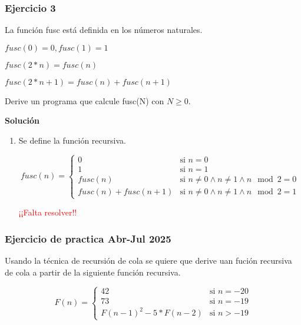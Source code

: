 \documentclass[hidelinks]{article}
\begin{document}
\subsubsection{Ejercicio 3}

La función fusc está definida en los números naturales.\par

$fusc(0) = 0, fusc(1) = 1$\par
$fusc(2*n) = fusc(n)$\par
$fusc(2*n + 1) = fusc(n) + fusc(n + 1)$\par

Derive un programa que calcule fusc(N) con $N \geq 0$.

\textbf{Solución}\par

\begin{enumerate}
	\item Se define la función recursiva.\par

	      \begin{equation}
		      fusc(n) =
		      \begin{cases}
			      0                     & \text{si } n = 0                                      \\
			      1                     & \text{si } n = 1                                      \\
			      fusc(n)               & \text{si } n \neq 0 \land n \neq 1 \land n \mod 2 = 0 \\
			      fusc(n) + fusc(n + 1) & \text{si } n \neq 0 \land n \neq 1 \land n \mod 2 = 1
		      \end{cases}
	      \end{equation} \par

	      \textcolor{red}{¡¡Falta resolver!!}
	
\end{enumerate}\newpage

\subsubsection{Ejercicio de practica Abr-Jul 2025}

Usando la técnica de recursión de cola se quiere que derive uan fución
recursiva de cola a partir de la siguiente función recursiva.\par

\begin{equation}
	F(n) =
	\begin{cases}
		42                          & \text{si } n = -20 \\
		73                          & \text{si } n = -19 \\
		F(n - 1)^2 - 5 * F(n - 2) & \text{si } n > -19
	\end{cases}
\end{equation} \par
\end{document}
